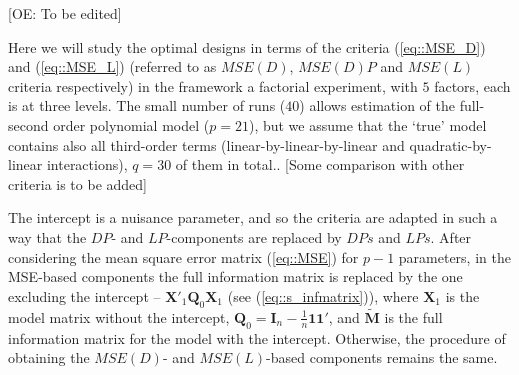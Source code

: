 [OE: To be edited]

Here we will study the optimal designs in terms of the criteria (\ref{eq::MSE_D}) and (\ref{eq::MSE_L}) (referred to as $MSE(D)$, $MSE(D)P$ and $MSE(L)$ criteria respectively) in the framework a factorial experiment, with $5$ factors, each is at three levels. The small number of runs ($40$) allows estimation of the full-second order polynomial model ($p=21$), but we assume that the `true' model contains also all third-order terms (linear-by-linear-by-linear and quadratic-by-linear interactions), $q=30$ of them in total.. 
[Some comparison with other criteria is to be added]

The intercept is a nuisance parameter, and so the criteria are adapted in such a way that the $DP$- and $LP$-components are replaced by $DPs$ and $LPs$. After considering the mean square error matrix (\ref{eq::MSE}) for $p-1$ parameters, in the MSE-based components the full information matrix is replaced by the one excluding the intercept -- $\bm{X}'_{1}\bm{Q}_0\bm{X}_{1}$ (see (\ref{eq::s_infmatrix})), where $\bm{X}_1$ is the model matrix without the intercept, $\bm{Q}_0=\bm{I}_n-\frac{1}{n}\bm{11}'$, and $\bm{\tilde{M}}$ is the full information matrix for the model with the intercept. Otherwise, the procedure of obtaining the $MSE(D)$- and $MSE(L)$-based components remains the same.

